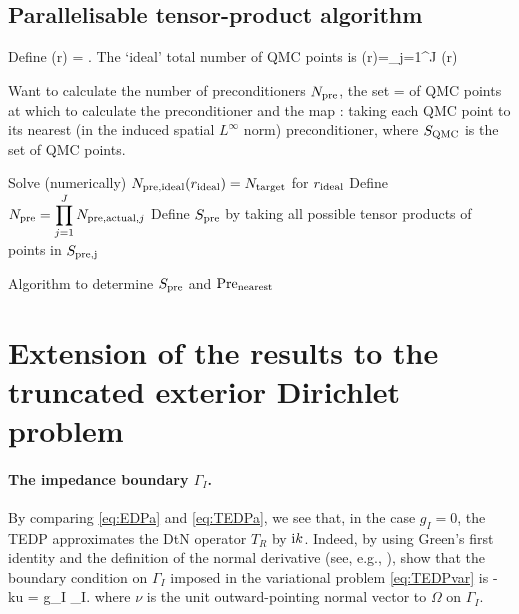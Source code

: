 \subsection{Parallelisable tensor-product algorithm}
Define
\beqs
\Npreidealj(r) = \max{}.
\eeqs
The `ideal' total number of QMC points is
\beqs
\Npreideal(r)=\prod_{j=1}^J  \Npreidealj(r)
\eeqs

Want to calculate the number of preconditioners $N_{\mathrm{pre}}$, the set
\beqs
\Spre=\set{\ypreo,\ldots,\ypreNpre}
\eeqs
of QMC points at which to calculate the preconditioner and the map
\beqs
\nearestpre:\SQMC\rightarrow\Spre
\eeqs
taking each QMC point to its nearest (in the induced spatial $L^\infty$ norm) preconditioner, where $S_{\mathrm{QMC}}$ is the set of QMC points.

\begin{algorithm}[h]
\DontPrintSemicolon
{}

\Input{$\Npreideal \in \NN$}
\Output{$\Spre$, $\nearestpre$}
\BlankLine
Solve (numerically) $N_{\mathrm{pre,ideal}}(r_{\mathrm{ideal}}) = N_{\mathrm{target}}$ for $r_{\mathrm{ideal}}$\;
Define $\displaystyle N_{\mathrm{pre}} = \prod_{j=1}^J N_{\mathrm{pre,actual},j}$\;
Define $\Spre$ by taking all possible tensor products of points in $S_{\mathrm{pre,j}}$\;
\caption{Algorithm to determine $\Spre$ and $\nearestpre$}
\end{algorithm}

\section{Extension of the results to the truncated exterior Dirichlet problem}\label{sec:TEDP}

\paragraph{The impedance boundary $\Gamma_I$.} By comparing \cref{eq:EDPa} and \cref{eq:TEDPa}, we see that, in the case $g_I=0$, the TEDP approximates the DtN operator $T_R$ by $\mathrm{i} k$. Indeed, by using Green's first identity and the definition of the normal derivative (see, e.g., \cite[Lemma 4.3]{Mc:00}), show that the boundary condition on $\Gamma_I$ imposed in the variational problem \cref{eq:TEDPvar} is 
\beq\label{eq:imp}
\dudnu - \ri k\gamma u = g_I \ton \Gamma_I.
\eeq
where $\nu$ is the unit outward-pointing normal vector to $\Omega$ on $\Gamma_I$.

